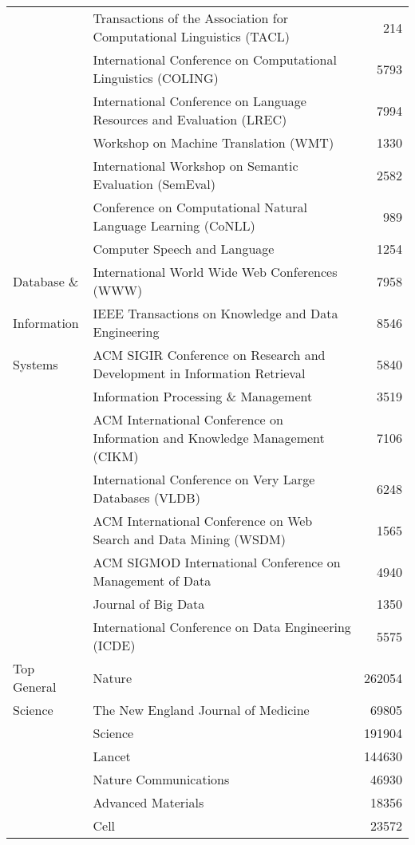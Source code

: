 {\begin{tabular}{p{2.5cm}lr}
         & Transactions of the Association for Computational Linguistics (TACL) & 214 \\
         & International Conference on Computational Linguistics (COLING) & 5793 \\
         & International Conference on Language Resources and Evaluation (LREC) & 7994 \\
         & Workshop on Machine Translation (WMT) & 1330 \\
         & International Workshop on Semantic Evaluation (SemEval) & 2582 \\
         & Conference on Computational Natural Language Learning (CoNLL) & 989 \\
         & Computer Speech and Language & 1254 \\
        \hline
        Database \& & International World Wide Web Conferences (WWW) & 7958 \\
        Information & IEEE Transactions on Knowledge and Data Engineering & 8546 \\
        Systems & ACM SIGIR Conference on Research and Development in Information Retrieval & 5840 \\
         & Information Processing \& Management & 3519 \\
         & ACM International Conference on Information and Knowledge Management (CIKM) & 7106 \\
         & International Conference on Very Large Databases (VLDB) & 6248 \\
         & ACM International Conference on Web Search and Data Mining (WSDM) & 1565 \\
         & ACM SIGMOD International Conference on Management of Data & 4940 \\
         & Journal of Big Data & 1350 \\
         & International Conference on Data Engineering (ICDE) & 5575 \\
         \hline
        Top General & Nature & 262054 \\
        Science & The New England Journal of Medicine & 69805 \\
        & Science & 191904 \\
        & Lancet & 144630 \\
        & Nature Communications & 46930 \\
        & Advanced Materials & 18356 \\
        & Cell & 23572 \\

\end{tabular}}
